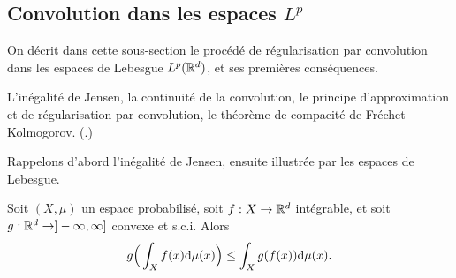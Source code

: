 
\subsection{Convolution dans les espaces $L^p$} %
\label{subsec:convLp}

On décrit dans cette sous-section le procédé de régularisation par convolution dans les espaces de Lebesgue $L^p(\mathbb{R}^d)$, et ses premières conséquences.


\begin{retenir}
	L'inégalité de Jensen, la continuité de la convolution, le principe d'approximation et de régularisation par convolution, le théorème de compacité de Fréchet-Kolmogorov.
	(.)
\end{retenir}




Rappelons d'abord l'inégalité de Jensen, ensuite illustrée par les espaces de Lebesgue.

\begin{proposition}
\label{prop:Jensen}
%
Soit $(X,\mu)$ un espace probabilisé, soit $f : X \to \mathbb{R}^d$ intégrable, et soit $g : \mathbb{R}^d \to ]-\infty,\infty]$ convexe et s.c.i. Alors
\begin{equation*}
	g\Big(\int_X f(x) \mathrm{d} \mu(x)\Big) \leq \int_X g(f(x)) \mathrm{d} \mu(x).
\end{equation*}
\end{proposition}

